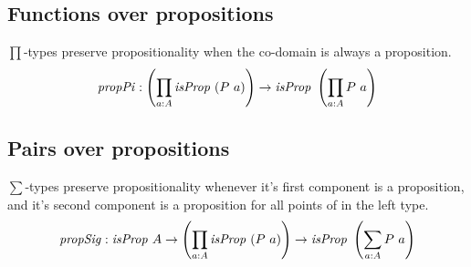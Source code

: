 \subsection{Functions over propositions}
\label{sec:propPi}
$\prod$-types preserve propositionality when the co-domain is always a
proposition.
%
$$
\mathit{propPi} \tp \left(\prod_{a \tp A} \isProp\ (P\ a)\right) \to \isProp\ \left(\prod_{a \tp A} P\ a\right)
$$
\subsection{Pairs over propositions}
\label{sec:propSig}
%
$\sum$-types preserve propositionality whenever it's first component is a
proposition, and it's second component is a proposition for all points of in the
left type.
%
$$
\mathit{propSig} \tp \isProp\ A \to \left(\prod_{a \tp A} \isProp\ (P\ a)\right) \to \isProp\ \left(\sum_{a \tp A} P\ a\right)
$$
